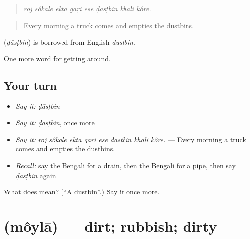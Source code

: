 \begin{quote}
       
\end{quote}

\begin{quote}
\emph{roj sôkāle ekṭā gāṛi ese ḍāsṭbin khāli kôre.}
\end{quote}

\begin{quote}
Every morning a truck comes and empties the dustbins.
\end{quote}

\begin{cousinweb}
\textbf{} (\emph{ḍāsṭbin}) is borrowed from English \emph{dustbin}.
\end{cousinweb}

\begin{grammarlens}[title={What you've built}]
One more word for getting around.
\end{grammarlens}

\subsection*{Your turn}
\begin{itemize}
\raggedright
  \item \emph{Say it:} \emph{ḍāsṭbin}
  \item \emph{Say it:} \emph{ḍāsṭbin}, once more
  \item \emph{Say it:} \emph{roj sôkāle ekṭā gāṛi ese ḍāsṭbin khāli kôre.} — Every morning a truck comes and empties the dustbins.
  \item \emph{Recall:} say the Bengali for a drain, then the Bengali for a pipe, then say \emph{ḍāsṭbin} again
\end{itemize}

\begin{tcolorbox}[breakable,colback=teal!4,colframe=teal!35!black,title={Before you move on}]
What does  mean? (\textquotedblleft{}A dustbin\textquotedblright{}.) Say it once more.
\end{tcolorbox}
\section[\texorpdfstring{\bn{ময়লা} (môylā)}{ময়লা (môylā)}]{ (môylā) — dirt; rubbish; dirty}

\label{lesson:BN-C413-moyla}



